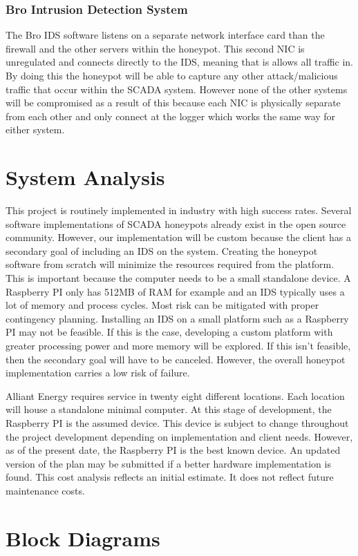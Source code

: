 \subsubsection{Bro Intrusion Detection System}
The Bro IDS software listens on a separate network interface card than the firewall and the other servers within the honeypot.  This second NIC is unregulated and connects directly to the IDS, meaning that is allows all traffic in.  By doing this the honeypot will be able to capture any other attack/malicious traffic that occur within the SCADA system.  However none of the other systems will be compromised as a result of this because each NIC is physically separate from each other and only connect at the logger which works the same way for either system.  

\section{System Analysis}
This project is routinely implemented in industry with high success rates. Several software implementations of SCADA honeypots already exist in the open source community. However, our implementation will be custom because the client has a secondary goal of including an IDS on the system. Creating the honeypot software from scratch will minimize the resources required from the platform. This is important because the computer needs to be a small standalone device. A Raspberry PI only has 512MB of RAM for example and an IDS typically uses a lot of memory and process cycles. Most risk can be mitigated with proper contingency planning. Installing an IDS on a small platform such as a Raspberry PI may not be feasible. If this is the case, developing a custom platform with greater processing power and more memory will be explored. If this isn't feasible, then the secondary goal will have to be canceled. However, the overall honeypot implementation carries a low risk of failure.

Alliant Energy requires service in twenty eight different locations. Each location will house a standalone minimal computer. At this stage of development, the Raspberry PI is the assumed device. This device is subject to change throughout the project development depending on implementation and client needs. However, as of the present date, the Raspberry PI is the best known device. An updated version of the plan may be submitted if a better hardware implementation is found. This cost analysis reflects an initial estimate. It does not reflect future maintenance costs.

\section{Block Diagrams}

\begin{figure}[h]
\centering
{

}
\end{figure}
